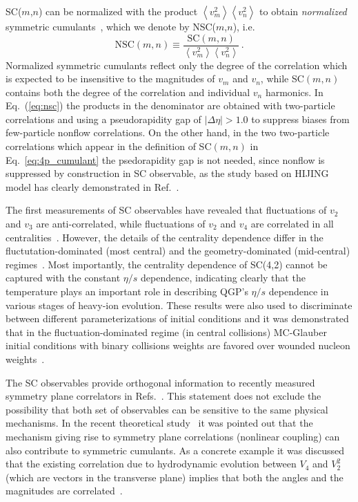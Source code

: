 SC($m$,$n$) can be normalized with the product $\left<v_{m}^2\right>\left<v_{n}^2\right>$ to obtain \textit{normalized} symmetric cumulants~\cite{ALICE:2016kpq,Giacalone:2016afq}, which we denote by NSC($m$,$n$), i.e.
%
\begin{equation}
\mathrm{NSC}(m,n) \equiv \frac{\mathrm{SC}(m,n)}{\left<v_{m}^2\right>\left<v_{n}^2\right>}\,.
\label{eq:nsc}
\end{equation}
%
Normalized symmetric cumulants reflect only the degree of the correlation which is expected to be insensitive to the magnitudes of $v_{m}$ and $v_{n}$, while SC$(m,n)$ contains both the degree of the correlation and individual $v_{n}$ harmonics. In Eq.~(\ref{eq:nsc}) the products in the denominator are obtained with two-particle correlations and using a pseudorapidity gap of $|\Delta\eta|>1.0$ to suppress biases from few-particle nonflow correlations. On the other hand, in the two two-particle correlations which appear in the definition of SC$(m,n)$ in Eq.~\ref{eq:4p_cumulant} the psedorapidity gap is not needed, since nonflow is suppressed by construction in SC observable, as the study based on HIJING model has clearly demonstrated in Ref.~\cite{ALICE:2016kpq}.

The first measurements of SC observables have revealed that fluctuations of $v_2$ and $v_3$ are anti-correlated, while fluctuations of $v_2$ and $v_4$ are correlated in all centralities~\cite{ALICE:2016kpq}. However, the details of the centrality dependence differ in the fluctutation-dominated (most central) and the geometry-dominated (mid-central) regimes~\cite{ALICE:2016kpq}. Most importantly, the centrality dependence of SC(4,2) cannot be captured with the constant $\eta/s$ dependence, indicating clearly that the temperature plays an important role in describing QGP's $\eta/s$ dependence in various stages of heavy-ion evolution. These results were also used to discriminate between different parameterizations of initial conditions and it was demonstrated that in the fluctuation-dominated regime (in central collisions) MC-Glauber initial conditions with binary collisions weights are favored over wounded nucleon weights~\cite{ALICE:2016kpq}. 

The SC observables provide orthogonal information to recently measured symmetry plane correlators in Refs.~\cite{ALICE:2011ab,Adare:2011tg,Aad:2014fla}. This statement does not exclude the possibility that both set of observables can be sensitive to the same physical mechanisms. In the recent theoretical study~\cite{Giacalone:2016afq} it was pointed out that the mechanism giving rise to symmetry plane correlations (nonlinear coupling) can also contribute to symmetric cumulants. As a concrete example it was discussed that the existing correlation due to hydrodynamic evolution between $V_4$ and $V_2^2$ (which are vectors in the transverse plane) implies that both the angles and the magnitudes are correlated~\cite{Giacalone:2016afq}. 

